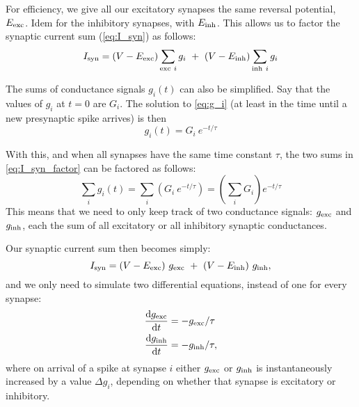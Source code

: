 For efficiency, we give all our excitatory synapses the same reversal potential, $E_{\text{exc}}$. Idem for the inhibitory synapses, with $E_{\text{inh}}$. This allows us to factor the synaptic current sum (\cref{eq:I_syn}) as follows:
\begin{equation}
    I_\syn = (V - E_\exc) \sum_{\exc\ i} g_i \  + \  (V - E_\inh) \sum_{\inh\ i} g_i
    \label{eq:I_syn_factor}
\end{equation}

The sums of conductance signals $g_i(t)$ can also be simplified. Say that the values of $g_i$ at $t = 0$ are $G_i$. The solution to \cref{eq:g_i} (at least in the time until a new presynaptic spike arrives) is then
\begin{equation}
    g_i(t) = G_i\ e^{-t/\tau}
\end{equation}

With this, and when all synapses have the same time constant $\tau$, the two sums in \cref{eq:I_syn_factor} can be factored as follows:\footnotemark
{}
\begin{equation}
    \sum_i g_i(t) = \sum_i \left( G_i\ e^{-t/\tau} \right)
                            = \left( \sum_i G_i  \right) e^{-t/\tau}
\end{equation}
This means that we need to only keep track of two conductance signals: $g_{\text{exc}}$ and $g_{\text{inh}}$, each the sum of all excitatory or all inhibitory synaptic conductances.


Our synaptic current sum then becomes simply:
\begin{equation}
    I_{\text{syn}} = (V - E_{\text{exc}})\ g_{\text{exc}} \  + \  (V - E_{\text{inh}})\ g_{\text{inh}},
\end{equation}
and we only need to simulate two differential equations, instead of one for every synapse:
\begin{align*}
    \frac{\mathrm{d}g_{\text{exc}}}{\mathrm{d}t} &= -g_{\text{exc}} / \tau \\
    \frac{\mathrm{d}g_{\text{inh}}}{\mathrm{d}t} &= -g_{\text{inh}} / \tau,
\end{align*}
where on arrival of a spike at synapse $i$ either $g_{\text{exc}}$ or $g_{\text{inh}}$ is instantaneously increased by a value $Δg_i$, depending on whether that synapse is excitatory or inhibitory.


